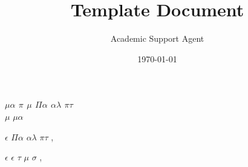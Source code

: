 \documentclass{article}
\title{Template Document}
\author{Academic Support Agent}
\date{\today}
\begin{document}
\maketitle


\begin{letter}
{\textbf{   $\mu$$\alpha$  $\pi$ $\mu$  $\Pi$$\alpha$ $\alpha$$\lambda$ $\pi$$\tau$ }\\ $\mu$ $\mu$$\alpha$}


\opening{ $\epsilon$ $\Pi$$\alpha$ $\alpha$$\lambda$ $\pi$$\tau$ ,}

\lipsum[1-6]


\vspace{-0,5cm}
\closing{ $\epsilon$ $\epsilon$ $\tau$ $\mu$ $\sigma$ ,}


\end{letter}
\end{document}
